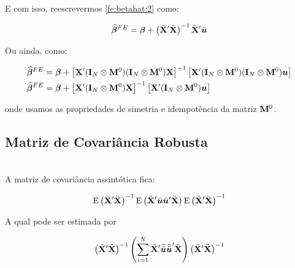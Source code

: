\documentclass[11pt, oneside, a4paper, article]{article}
\numberwithin{equation}{section}
\begin{document}
\vspace{1 em}
\noindent
E com isso, reescrevermos \eqref{fe:betahat:2} como:

\vspace{-1 em}
\begin{align} \label{fe:betahat:3}
	\widehat{\boldsymbol{\beta}}^{FE} =
	\boldsymbol{\beta} +
	\left( \ddot{\mathbf{X}}' \ddot{\mathbf{X}} \right)^{-1}
	\ddot{\mathbf{X}}' \ddot{\boldsymbol{u}}
\end{align}

\noindent
Ou ainda, como:

\vspace{-1 em}
\begin{align}
	\notag
	\widehat{\boldsymbol{\beta}}^{FE} &=
	\boldsymbol{\beta} +
	\left[ \mathbf{X}' ( \mathbf{I}_{N} \otimes \mathbf{M}^{0} )( \mathbf{I}_{N} \otimes \mathbf{M}^{0} ) \mathbf{X} \right]^{-1}
	\left[ \mathbf{X}' ( \mathbf{I}_{N} \otimes \mathbf{M}^{0} )( \mathbf{I}_{N} \otimes \mathbf{M}^{0} ) \boldsymbol{u} \right]
	\\
	\label{fe:betahat:4}
	\widehat{\boldsymbol{\beta}}^{FE} &=
	\boldsymbol{\beta} +
	\left[ \mathbf{X}' ( \mathbf{I}_{N} \otimes \mathbf{M}^{0} ) \mathbf{X} \right]^{-1}
	\left[ \mathbf{X}' ( \mathbf{I}_{N} \otimes \mathbf{M}^{0} ) \boldsymbol{u} \right]
\end{align}

\noindent
onde usamos as propriedades de simetria e idempotência da matriz $\mathbf{M}^{0}$.

\subsection{Matriz de Covariância Robusta}
\noindent
\citet[sec.10.5.2 -- Asymptotic Inference with Fixed Effects, p.269--272]{wool-2010} \\

A matriz de covariância assintótica fica:

\vspace{-1 em}
\begin{align*}
	\text{E}\left( \ddot{\mathbf{X}}' \ddot{\mathbf{X}} \right)^{-1}
	\text{E}\left( \ddot{\mathbf{X}}' \ddot{\boldsymbol{u}} \ddot{\boldsymbol{u}}' \ddot{\mathbf{X}} \right)
	\text{E}\left( \ddot{\mathbf{X}}' \ddot{\mathbf{X}} \right)^{-1}
\end{align*}

A qual pode ser estimada por

\vspace{-1 em}
\begin{align*}
	\left( \ddot{\mathbf{X}}' \ddot{\mathbf{X}} \right)^{-1}
	\left( \sum_{i=1}^{N} \ddot{\mathbf{X}}'
		\widehat{\ddot{\boldsymbol{u}}} \widehat{\ddot{\boldsymbol{u}}}'
	\ddot{\mathbf{X}} \right)
	\left( \ddot{\mathbf{X}}' \ddot{\mathbf{X}} \right)^{-1}
\end{align*}
\end{document}
